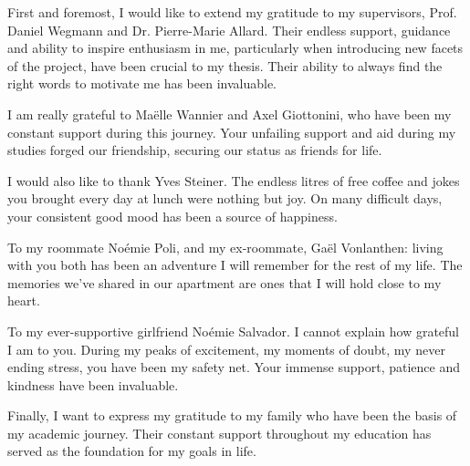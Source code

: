 \documentclass[
11pt, %
oneside, %
english, %
singlespacing, %
headsepline, %
chapterinoneline, %
]{MastersDoctoralThesis} %
\begin{document}
\begin{acknowledgements}\label{sec:acknowledgements}
\addchaptertocentry{\acknowledgementname} %
First and foremost, I would like to extend my gratitude to my supervisors, Prof. Daniel Wegmann and Dr. Pierre-Marie Allard. Their endless support, guidance and ability to inspire enthusiasm in me, particularly when introducing new facets of the project, have been crucial to my thesis. Their ability to always find the right words to motivate me has been invaluable.

I am really grateful to Maëlle Wannier and Axel Giottonini, who have been my constant support during this journey. Your unfailing support and aid during my studies forged our friendship, securing our status as friends for life. 

I would also like to thank Yves Steiner. The endless litres of free coffee and jokes you brought every day at lunch were nothing but joy. On many difficult days, your consistent good mood has been a source of happiness. 

To my roommate Noémie Poli, and my ex-roommate, Gaël Vonlanthen: living with you both has been an adventure I will remember for the rest of my life. The memories we've shared in our apartment are ones that I will hold close to my heart. 

To my ever-supportive girlfriend Noémie Salvador. I cannot explain how grateful I am to you. During my peaks of excitement, my moments of doubt, my never ending stress, you have been my safety net. Your immense support, patience and kindness have been invaluable. 

Finally, I want to express my gratitude to my family who have been the basis of my academic journey. Their constant support throughout my education has served as the foundation for my goals in life.

\end{acknowledgements}


\tableofcontents %


\end{document}
